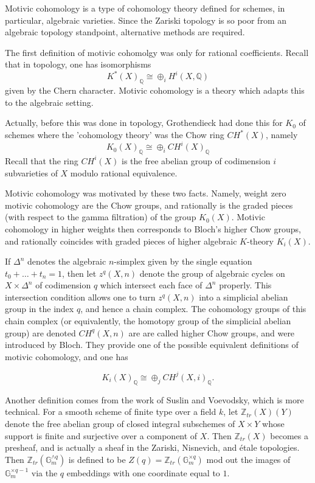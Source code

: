 \documentclass[12pt]{article}
\begin{document}
Motivic cohomology is a type of cohomology theory defined for schemes, in particular, algebraic varieties. Since the Zariski topology is so poor from an algebraic topology standpoint, alternative methods are required.

The first definition of motivic cohomolgy was only for rational coefficients. Recall that in topology, one has isomorphisms
$$ K^*(X)_\mathbb{Q} \cong \oplus_i H^i(X,\mathbb{Q})$$
given by the Chern character. Motivic cohomology is a theory which adapts this to the algebraic setting.

Actually, before this was done in topology, Grothendieck had done this for $K_0$ of schemes where the 'cohomology theory' was the Chow ring $CH^*(X)$, namely
$$ K_0(X)_\mathbb{Q} \cong \oplus_i CH^i(X)_\mathbb{Q}$$
Recall that the ring $CH^i(X)$ is the free abelian group of codimension $i$ subvarieties of $X$ modulo rational equivalence.

Motivic cohomology was motivated by these two facts. Namely, weight zero motivic cohomology are the Chow groups, and rationally is the graded pieces (with respect to the gamma filtration) of the group $K_0(X)$. Motivic cohomology in higher weights then corresponds to Bloch's higher Chow groups, and rationally coincides with graded pieces of higher algebraic $K$-theory $K_i(X)$.

If $\Delta^n$ denotes the algebraic $n$-simplex given by the single equation $t_0 + \ldots + t_n = 1$, then let $z^q(X,n)$ denote the group of algebraic cycles on $X \times \Delta^n$ of codimension $q$ which intersect each face of $\Delta^n$ properly. This intersection condition allows one to turn $z^q(X,n)$ into a simplicial abelian group in the index $q$, and hence a chain complex. The cohomology groups of this chain complex (or equivalently, the homotopy group of the simplicial abelian group) are denoted $CH^q(X,n)$ are are called higher Chow groups, and were introduced by Bloch. They provide one of the possible equivalent definitions of motivic cohomology, and one has

$$ K_i(X)_\mathbb{Q} \cong \oplus_j CH^j(X,i)_\mathbb{Q}.$$

Another definition comes from the work of Suslin and Voevodsky, which is more technical. For a smooth scheme of finite type over a field $k$, let $\mathbb{Z}_{tr}(X)(Y)$ denote the free abelian group of closed integral subschemes of $X \times Y$ whose support is finite and surjective over a component of $X$. Then $\mathbb{Z}_{tr}(X)$ becomes a presheaf, and is actually a sheaf in the Zariski, Nisnevich, and \'etale topologies. Then $\mathbb{Z}_{tr}(\mathbb{G}_m^{\wedge q})$ is defined to be $Z(q) = \mathbb{Z}_{tr}(\mathbb{G}_m^{\times q})$ mod out the images of $\mathbb{G}_m^{\times q-1}$ via the $q$ embeddings with one coordinate equal to $1$.
\end{document}
